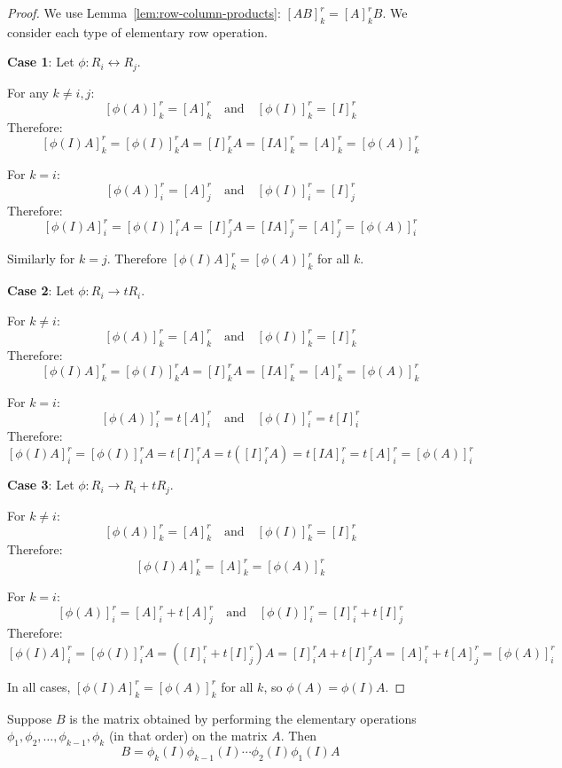 \begin{proof}
    We use Lemma~\ref{lem:row-column-products}: $[AB]_k^r = [A]_k^r B$. We consider each type of elementary row operation.
    
    \textbf{Case 1}: Let $\phi: R_i \leftrightarrow R_j$.
    
    For any $k \neq i, j$:
    \[
    [\phi(A)]_k^r = [A]_k^r \quad \text{and} \quad [\phi(I)]_k^r = [I]_k^r
    \]
    Therefore:
    \[
    [\phi(I)A]_k^r = [\phi(I)]_k^r A = [I]_k^r A = [IA]_k^r = [A]_k^r = [\phi(A)]_k^r
    \]
    
    For $k = i$:
    \[
    [\phi(A)]_i^r = [A]_j^r \quad \text{and} \quad [\phi(I)]_i^r = [I]_j^r
    \]
    Therefore:
    \[
    [\phi(I)A]_i^r = [\phi(I)]_i^r A = [I]_j^r A = [IA]_j^r = [A]_j^r = [\phi(A)]_i^r
    \]
    
    Similarly for $k = j$. Therefore $[\phi(I)A]_k^r = [\phi(A)]_k^r$ for all $k$.
    
    \textbf{Case 2}: Let $\phi: R_i \to tR_i$.
    
    For $k \neq i$:
    \[
    [\phi(A)]_k^r = [A]_k^r \quad \text{and} \quad [\phi(I)]_k^r = [I]_k^r
    \]
    Therefore:
    \[
    [\phi(I)A]_k^r = [\phi(I)]_k^r A = [I]_k^r A = [IA]_k^r = [A]_k^r = [\phi(A)]_k^r
    \]
    
    For $k = i$:
    \[
    [\phi(A)]_i^r = t[A]_i^r \quad \text{and} \quad [\phi(I)]_i^r = t[I]_i^r
    \]
    Therefore:
    \[
    [\phi(I)A]_i^r = [\phi(I)]_i^r A = t[I]_i^r A = t([I]_i^r A) = t[IA]_i^r = t[A]_i^r = [\phi(A)]_i^r
    \]
    
    \textbf{Case 3}: Let $\phi: R_i \to R_i + tR_j$.
    
    For $k \neq i$:
    \[
    [\phi(A)]_k^r = [A]_k^r \quad \text{and} \quad [\phi(I)]_k^r = [I]_k^r
    \]
    Therefore:
    \[
    [\phi(I)A]_k^r = [A]_k^r = [\phi(A)]_k^r
    \]
    
    For $k = i$:
    \[
    [\phi(A)]_i^r = [A]_i^r + t[A]_j^r \quad \text{and} \quad [\phi(I)]_i^r = [I]_i^r + t[I]_j^r
    \]
    Therefore:
    \[
    [\phi(I)A]_i^r = [\phi(I)]_i^r A = ([I]_i^r + t[I]_j^r)A = [I]_i^r A + t[I]_j^r A = [A]_i^r + t[A]_j^r = [\phi(A)]_i^r
    \]
    
    In all cases, $[\phi(I)A]_k^r = [\phi(A)]_k^r$ for all $k$, so $\phi(A) = \phi(I)A$.
\end{proof}

\begin{corollary}\label{cor:elementary-sequence}
    Suppose $B$ is the matrix obtained by performing the elementary operations $\phi_1, \phi_2, \ldots, \phi_{k-1}, \phi_k$ (in that order) on the matrix $A$. Then
    \[
    B = \phi_k(I) \phi_{k-1}(I) \cdots \phi_2(I) \phi_1(I) A
    \]
\end{corollary}

